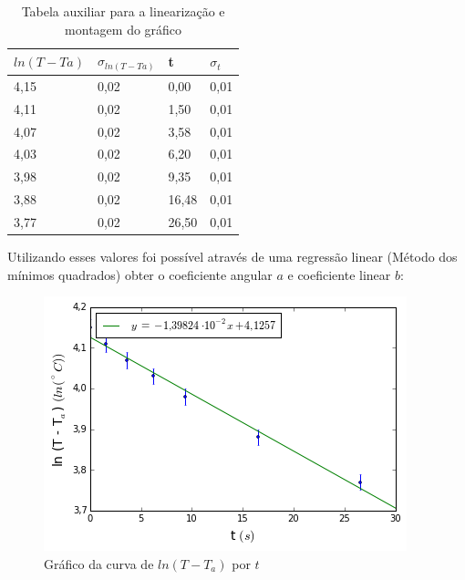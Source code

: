 \documentclass[a4paper]{article}
\providecommand{\tabularnewline}{\\}
\providecommand{\tabularnewline}{\\} %
\begin{document}
\begin{table}[!ht]
	\begin{center}
	\caption{Tabela auxiliar para a linearização e montagem do gráfico}
	\begin{tabular}{|l|l|l|l|}
    \hline
    $ln (T-Ta)$ & $\sigma_{ln (T-Ta)}$ & t     & $\sigma_t$ \\ \hline
    4,15                & 0,02                                 & 0,00  & 0,01  \tabularnewline \hline
    4,11                & 0,02                                 & 1,50  & 0,01  \tabularnewline \hline
    4,07                & 0,02                                 & 3,58  & 0,01  \tabularnewline \hline
    4,03                & 0,02                                 & 6,20  & 0,01  \tabularnewline \hline
    3,98                & 0,02                                 & 9,35  & 0,01  \tabularnewline \hline
    3,88                & 0,02                                 & 16,48 & 0,01  \tabularnewline \hline
    3,77                & 0,02                                 & 26,50 & 0,01  \tabularnewline \hline
    \end{tabular}
    \end{center}
\end{table}


	
	
	Utilizando esses valores foi possível através de uma regressão linear (Método dos mínimos quadrados) obter o coeficiente angular $a$ e coeficiente linear $b$:
	
\begin{figure}[!ht]
	\begin{centering}
		\includegraphics[scale=0.745]{exp06a-parte2.png}
	\par\end{centering}
	\caption{Gráfico da curva de $ln(T-T_a)$ por $t$}
\end{figure}
\end{document}
